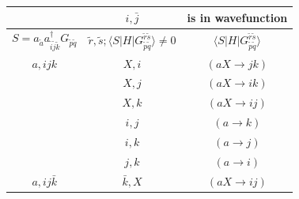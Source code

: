 \begin{table}
\begin{tabular}{ c|c|c }
		                                                                                                   & $i,\bar j$                                                                                   & is in wavefunction                                              \\ 
		\hline \hline
		$S = a_{\tilde a} a^\dagger_{\tilde i \tilde j \tilde k} G_{\tilde p \tilde q} $                   & $\tilde r, \tilde s ; \langle S|H|G_{\tilde p \tilde q}^{\tilde r \tilde s} \rangle \neq 0$  & $\langle S|H|G_{\tilde p \tilde q}^{\tilde r \tilde s} \rangle$ \\
		\hline \hline
		\rule{0pt}{3ex} $a,ijk$                                                                                            & $X,i$                                                                                        & $(aX\rightarrow jk)$                                            \\
		                                                                                                   & $X,j$                                                                                        & $(aX\rightarrow ik)$                                            \\
		                                                                                                   & $X,k$                                                                                        & $(aX\rightarrow ij)$                                            \\
		                                                                                                   & $i,j$                                                                                        & $(a\rightarrow k)$                                              \\
		                                                                                                   & $i,k$                                                                                        & $(a\rightarrow j)$                                              \\
		                                                                                                   & $j,k$                                                                                        & $(a\rightarrow i)$                                              \\
		\hline
		\rule{0pt}{3ex} $a,ij \bar k$                                                                                      & $\bar k,X$                                                                                   & $(aX\rightarrow ij)$                                            \\

\end{tabular}
\end{table}
